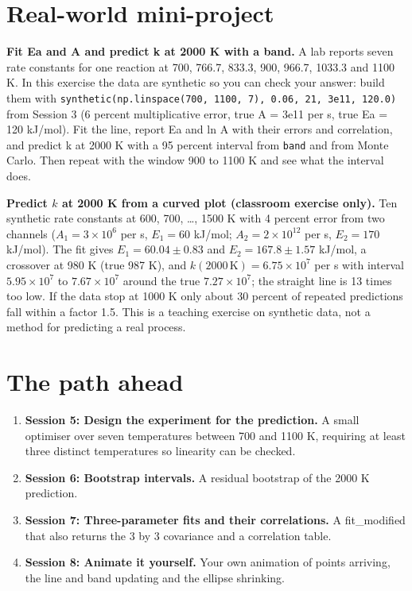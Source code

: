 \documentclass[11pt,a4paper]{article}
\begin{document}
\section{Real-world mini-project}
\textbf{Fit Ea and A and predict k at 2000 K with a band.} A lab reports seven rate constants for one reaction at 700, 766.7, 833.3, 900, 966.7, 1033.3 and 1100 K. In this exercise the data are synthetic so you can check your answer: build them with \texttt{synthetic(np.linspace(700, 1100, 7), 0.06, 21, 3e11, 120.0)} from Session 3 (6 percent multiplicative error, true A = 3e11 per s, true Ea = 120 kJ/mol). Fit the line, report Ea and ln A with their errors and correlation, and predict k at 2000 K with a 95 percent interval from \texttt{band} and from Monte Carlo. Then repeat with the window 900 to 1100 K and see what the interval does.

\textbf{Predict $k$ at 2000 K from a curved plot (classroom exercise only).} Ten synthetic rate constants at 600, 700, \dots, 1500 K with 4 percent error from two channels ($A_1=3\times10^6$ per s, $E_1=60$ kJ/mol; $A_2=2\times10^{12}$ per s, $E_2=170$ kJ/mol). The fit gives $E_1=60.04\pm0.83$ and $E_2=167.8\pm1.57$ kJ/mol, a crossover at 980 K (true 987 K), and $k(2000\,\mathrm{K})=6.75\times10^7$ per s with interval $5.95\times10^7$ to $7.67\times10^7$ around the true $7.27\times10^7$; the straight line is 13 times too low. If the data stop at 1000 K only about 30 percent of repeated predictions fall within a factor 1.5. This is a teaching exercise on synthetic data, not a method for predicting a real process.

\section{The path ahead}
\begin{enumerate}[nosep]
\item \textbf{Session 5: Design the experiment for the prediction.} A small optimiser over seven temperatures between 700 and 1100 K, requiring at least three distinct temperatures so linearity can be checked.
\item \textbf{Session 6: Bootstrap intervals.} A residual bootstrap of the 2000 K prediction.
\item \textbf{Session 7: Three-parameter fits and their correlations.} A fit\_modified that also returns the 3 by 3 covariance and a correlation table.
\item \textbf{Session 8: Animate it yourself.} Your own animation of points arriving, the line and band updating and the ellipse shrinking.
\end{enumerate}
\end{document}
